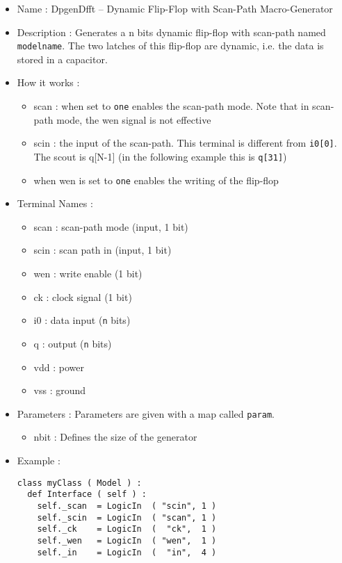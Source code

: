 \begin{itemize}
    \item Name : DpgenDfft -- Dynamic Flip-Flop with Scan-Path Macro-Generator
    \item Description : Generates a n bits dynamic flip-flop with scan-path named \verb-modelname-. The two latches of this flip-flop are dynamic, i.e. the data is stored in a capacitor.
    \item How it works : 
    \begin{itemize}
        \item scan : when set to \verb-one- enables the scan-path mode. Note that in scan-path mode, the wen signal is not effective
        \item scin : the input of the scan-path. This terminal is different from \verb-i0[0]-. The scout is q[N-1] (in the following example this is \verb-q[31]-)
        \item when wen is set to \verb-one- enables the writing of the flip-flop
    \end{itemize}
    \item Terminal Names :
    \begin{itemize}
        \item scan : scan-path mode (input, 1 bit)
        \item scin : scan path in (input, 1 bit)
        \item wen : write enable (1 bit)
        \item ck : clock signal (1 bit)
        \item i0 : data input (\verb-n- bits)
        \item q : output (\verb-n- bits)
        \item vdd : power
        \item vss : ground
    \end{itemize}
    \item Parameters : Parameters are given with a map called \verb-param-.
    \begin{itemize}
        \item nbit : Defines the size of the generator
    \end{itemize}
    \item Example :
\begin{verbatim}
class myClass ( Model ) :
  def Interface ( self ) :
    self._scan  = LogicIn  ( "scin", 1 )
    self._scin  = LogicIn  ( "scan", 1 )
    self._ck    = LogicIn  (  "ck",  1 )
    self._wen   = LogicIn  ( "wen",  1 )
    self._in    = LogicIn  (  "in",  4 )
    

\end{verbatim}
\end{itemize}
